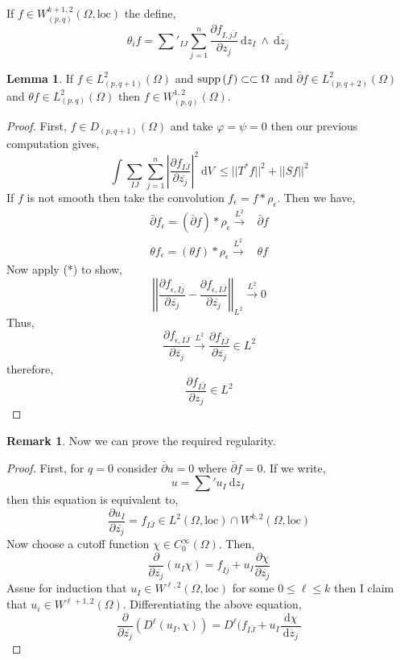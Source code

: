 \documentclass[12pt]{extarticle}
\renewcommand{\d}[1]{\: \mathrm{d}#1 \:}
\newcommand{\deriv}[2]{\frac{\d{#1}}{\d{#2}}}
\newcommand{\pderiv}[2]{\frac{\partial{#1}}{\partial{#2}}}
\theoremstyle{definition}
\newtheorem{lemma}[theorem]{Lemma}
\newtheorem{remark}{Remark}
\newenvironment{definition}[1][Definition:]{\begin{trivlist}
\item[\hskip \labelsep {\bfseries #1}]}{\end{trivlist}}
\begin{document}
\begin{definition}
If $f \in W^{k+1,2}_{(p,q)}(\Omega, \text{loc})$ the define,
\[ \theta_i f = \sum'_{IJ} \sum_{j = 1}^n \pderiv{f_{I, \overline{jJ}}}{z_j} \d{z_I} \wedge \overline{\d{z_{\bar{j}}}} \]
\end{definition}

\begin{lemma}
If $f \in L^2_{(p,q+1)}(\Omega)$ and $\mathrm{supp}\left( f \right) \subset \subset \Omega$ and $\bar{\partial} f \in L^2_{(p,q+2)}(\Omega)$ and $\theta f \in L^2_{(p,q)}(\Omega)$ then $f \in W^{1,2}_{(p,q)}(\Omega)$.
\end{lemma}

\begin{proof}
First, $f \in D_{(p, q+1)}(\Omega)$ and take $\varphi = \psi = 0$ then our previous computation gives,
\[ \int \sum_{IJ} \sum^n_{j = 1} \left| \pderiv{f_{I \bar{J}}}{\overline{z_j}} \right|^2 \d{V} \le || T^* f ||^2 + || S f ||^2 \]
If $f$ is not smooth then take the convolution $f_\epsilon = f * \rho_\epsilon$. Then we have,
\begin{align*}
\bar{\partial} f_\epsilon = (\bar{\partial} f) * \rho_\epsilon \xrightarrow{L^2} & \bar{\partial} f 
\\
\theta f_\epsilon = (\theta f) * \rho_\epsilon \xrightarrow{L^2} & \theta f 
\end{align*}
Now apply (*) to show,
\[ \left|\left| \pderiv{f_{\epsilon, I \bar{j}}}{\overline{z_j}} - \pderiv{f_{\epsilon, I \bar{J}}}{\overline{z_j}} \right| \right|_{L^2} \xrightarrow{L^2} 0 \]
Thus,
\[ \pderiv{f_{\epsilon, I \bar{J}}}{\overline{z_j}} \xrightarrow{L^2} \pderiv{f_{I\bar{J}}}{\overline{z_j}} \in L^2 \]
therefore,
\[ \pderiv{f_{I \bar{J}}}{z_j} \in L^2 \]
\end{proof}

\begin{remark}
Now we can prove the required regularity.
\end{remark}

\begin{proof}
First, for $q = 0$ consider $\bar{\partial} u = 0$ where $\bar{\partial} f = 0$. If we write,
\[ u = \sum' u_I \d{z_I} \]
then this equation is equivalent to,
\[ \pderiv{u_I}{\overline{z_j}} = f_{I \bar{J}} \in L^2(\Omega, \text{loc}) \cap W^{k,2}(\Omega, \text{loc}) \]
Now choose a cutoff function $\chi \in C^\infty_0(\Omega)$. Then,
\[ \pderiv{}{\overline{z_j}}(u_I \chi) = f_{I \bar{j}} + u_I \pderiv{\chi}{\overline{z_j}} \]
Assue for induction that $u_I \in W^{\ell, 2}(\Omega, \text{loc})$ for some $0 \le \ell \le k$ then I claim that $u_i \in W^{\ell + 1, 2}(\Omega)$. Differentiating the above equation,
\[ \pderiv{}{\overline{z_j}} (D^\ell (u_I, \chi)) = D^\ell (f_{I \bar{J}} + u_I \deriv{\chi}{\overline{z}_j} \]
\end{proof}
\end{document}
